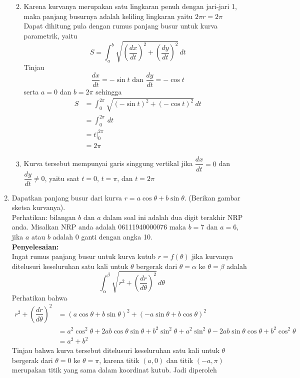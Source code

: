 \documentclass{article}
\begin{document}
\begin{enumerate}
\begin{enumerate}
\begin{center}
	\end{center}
	\item Karena kurvanya merupakan satu lingkaran penuh dengan jari-jari 1, maka panjang busurnya adalah keliling lingkaran yaitu $2\pi r=2\pi$\\
	Dapat dihitung pula dengan rumus panjang busur untuk kurva parametrik, yaitu 
	$$ S=\int_a^b \sqrt{\left(\dfrac{dx}{dt}\right)^2+\left(\dfrac{dy}{dt}\right)^2}\, dt $$ 
	Tinjau 
	$$ \dfrac{dx}{dt} = -\sin t \text{   dan   } \dfrac{dy}{dt}=-\cos t $$
	serta $a=0$ dan $b=2\pi$ sehingga 
	\begin{align*}
	S &= \int_0^{2\pi}\sqrt{(-\sin t)^2+(-\cos t)^2}\, dt\\
	&= \int_0^{2\pi}\, dt\\
	&= t\big|_0^{2\pi}\\
	&= 2\pi 
	\end{align*}
	\item Kurva tersebut mempunyai garis singgung vertikal jika $\dfrac{dx}{dt}=0$ dan $\dfrac{dy}{dt}\neq 0$, yaitu saat $t=0$, $t=\pi$, dan $t=2\pi$
	\end{enumerate}
	\item Dapatkan panjang busur dari kurva $r=a\cos \theta+b\sin\theta$. (Berikan gambar sketsa kurvanya).\\
	Perhatikan: bilangan $b$ dan $a$ dalam soal ini adalah dua digit terakhir NRP anda. Misalkan NRP anda adalah 06111940000076 maka $b=7$ dan $a=6$, jika $a$ atau $b$ adalah 0 ganti dengan angka 10.\\
	\textbf{Penyelesaian:}\\
	Ingat rumus panjang busur untuk kurva kutub $r=f(\theta)$ jika kurvanya ditelusuri keseluruhan satu kali untuk $\theta$ bergerak dari $\theta=\alpha$ ke $\theta=\beta$ adalah 
	$$ \int_{\alpha}^{\beta}\sqrt{r^2+\left(\dfrac{dr}{d\theta}\right)^2} \, d\theta $$
	Perhatikan bahwa
	\begin{align*}
	r^2 + \left(\dfrac{dr}{d\theta}\right)^2 &= ( a\cos \theta+b\sin\theta)^2+(-a\sin \theta+b\cos\theta)^2\\
	&= a^2\cos^2 \theta+2ab\cos\theta\sin\theta+b^2\sin^2\theta+a^2\sin^2\theta-2ab\sin\theta\cos\theta+b^2\cos^2\theta\\
	&= a^2+b^2
	\end{align*}
	Tinjau bahwa kurva tersebut ditelusuri keseluruhan satu kali untuk $\theta$ bergerak dari $\theta=0$ ke $\theta=\pi$, karena titik $(a,0)$ dan titik $(-a,\pi)$ merupakan titik yang sama dalam koordinat kutub. Jadi diperoleh 

\end{enumerate}
\end{document}
